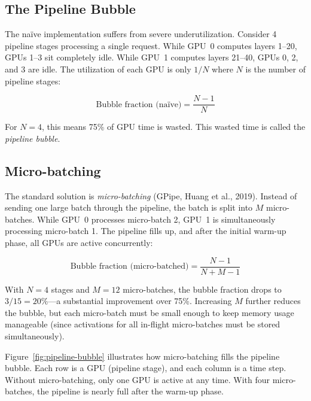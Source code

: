 \subsection{The Pipeline Bubble}

The na\"ive implementation suffers from severe underutilization. Consider 4 pipeline stages processing a single request. While GPU~0 computes layers 1--20, GPUs 1--3 sit completely idle. While GPU~1 computes layers 21--40, GPUs 0, 2, and 3 are idle. The utilization of each GPU is only $1/N$ where $N$ is the number of pipeline stages:

\begin{equation}
\label{eq:bubble-naive}
\text{Bubble fraction (na\"ive)} = \frac{N - 1}{N}
\end{equation}

For $N = 4$, this means 75\% of GPU time is wasted. This wasted time is called the \emph{pipeline bubble}.

\subsection{Micro-batching}

The standard solution is \emph{micro-batching} (GPipe, Huang et al., 2019). Instead of sending one large batch through the pipeline, the batch is split into $M$ micro-batches. While GPU~0 processes micro-batch 2, GPU~1 is simultaneously processing micro-batch 1. The pipeline fills up, and after the initial warm-up phase, all GPUs are active concurrently:

\begin{equation}
\label{eq:bubble-micro}
\text{Bubble fraction (micro-batched)} = \frac{N - 1}{N + M - 1}
\end{equation}

With $N = 4$ stages and $M = 12$ micro-batches, the bubble fraction drops to $3/15 = 20\%$---a substantial improvement over 75\%. Increasing $M$ further reduces the bubble, but each micro-batch must be small enough to keep memory usage manageable (since activations for all in-flight micro-batches must be stored simultaneously).

Figure~\ref{fig:pipeline-bubble} illustrates how micro-batching fills the pipeline bubble. Each row is a GPU (pipeline stage), and each column is a time step. Without micro-batching, only one GPU is active at any time. With four micro-batches, the pipeline is nearly full after the warm-up phase.

